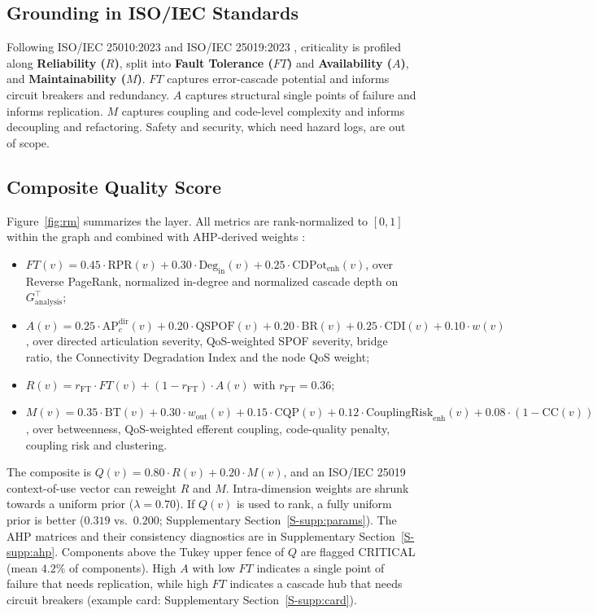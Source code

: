 \documentclass[preprint,3p]{elsarticle}
\providecommand{\tightlist}{%
  \setlength{\itemsep}{0pt}\setlength{\parskip}{0pt}}
\begin{document}
\subsection{Grounding in ISO/IEC Standards}
\label{sec:5.1}

Following ISO/IEC 25010:2023 \cite{iso25010_2023} and ISO/IEC 25019:2023 \cite{iso25019_2023}, criticality is profiled along \textbf{Reliability ($R$)}, split into \textbf{Fault Tolerance ($FT$)} and \textbf{Availability ($A$)}, and \textbf{Maintainability ($M$)}. $FT$ captures error-cascade potential and informs circuit breakers and redundancy. $A$ captures structural single points of failure and informs replication. $M$ captures coupling and code-level complexity and informs decoupling and refactoring. Safety and security, which need hazard logs, are out of scope.

\subsection{Composite Quality Score}
\label{sec:5.2}

Figure~\ref{fig:rm} summarizes the layer. All metrics are rank-normalized to $[0, 1]$ within the graph and combined with AHP-derived weights \cite{saaty1980ahp}:
\begin{itemize}\tightlist
    \item $FT(v) = 0.45 \cdot \text{RPR}(v) + 0.30 \cdot \text{Deg}_{\text{in}}(v) + 0.25 \cdot \text{CDPot}_{\text{enh}}(v)$, over Reverse PageRank, normalized in-degree and normalized cascade depth on $G_{\text{analysis}}^\top$;
    \item $A(v) = 0.25 \cdot \text{AP}_c^{\text{dir}}(v) + 0.20 \cdot \text{QSPOF}(v) + 0.20 \cdot \text{BR}(v) + 0.25 \cdot \text{CDI}(v) + 0.10 \cdot w(v)$, over directed articulation severity, QoS-weighted SPOF severity, bridge ratio, the Connectivity Degradation Index and the node QoS weight;
    \item $R(v) = r_{\text{FT}} \cdot FT(v) + (1 - r_{\text{FT}}) \cdot A(v)$ with $r_{\text{FT}} = 0.36$;
    \item $M(v) = 0.35 \cdot \text{BT}(v) + 0.30 \cdot w_{\text{out}}(v) + 0.15 \cdot \text{CQP}(v) + 0.12 \cdot \text{CouplingRisk}_{\text{enh}}(v) + 0.08 \cdot (1 - \text{CC}(v))$, over betweenness, QoS-weighted efferent coupling, code-quality penalty, coupling risk and clustering.
\end{itemize}
The composite is $Q(v) = 0.80 \cdot R(v) + 0.20 \cdot M(v)$, and an ISO/IEC 25019 context-of-use vector can reweight $R$ and $M$. Intra-dimension weights are shrunk towards a uniform prior ($\lambda = 0.70$). If $Q(v)$ is used to rank, a fully uniform prior is better ($0.319$ vs.\ $0.200$; Supplementary Section~\ref{S-supp:params}). The AHP matrices and their consistency diagnostics are in Supplementary Section~\ref{S-supp:ahp}. Components above the Tukey upper fence of $Q$ are flagged CRITICAL (mean $4.2\%$ of components). High $A$ with low $FT$ indicates a single point of failure that needs replication, while high $FT$ indicates a cascade hub that needs circuit breakers (example card: Supplementary Section~\ref{S-supp:card}).
\end{document}
